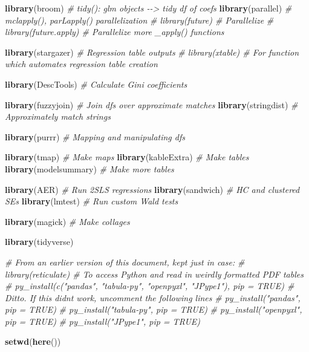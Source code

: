 \documentclass[
]{article}
\newenvironment{Shaded}{\begin{snugshade}}{\end{snugshade}}
\newcommand{\CommentTok}[1]{\textcolor[rgb]{0.56,0.35,0.01}{\textit{#1}}}
\newcommand{\FunctionTok}[1]{\textcolor[rgb]{0.13,0.29,0.53}{\textbf{#1}}}
\newcommand{\NormalTok}[1]{#1}
\begin{document}
\begin{Shaded}
\begin{Highlighting}[]
\FunctionTok{library}\NormalTok{(broom) }\CommentTok{\# tidy(): glm objects {-}{-}\textgreater{} tidy df of coefs }
\FunctionTok{library}\NormalTok{(parallel) }\CommentTok{\# mclapply(), parLapply() parallelization}
\CommentTok{\# library(future) \# Parallelize }
\CommentTok{\# library(future.apply) \# Parallelize more \_apply() functions}

\FunctionTok{library}\NormalTok{(stargazer) }\CommentTok{\# Regression table outputs}
\CommentTok{\# library(xtable) \# For function which automates regression table creation}

\FunctionTok{library}\NormalTok{(DescTools) }\CommentTok{\# Calculate Gini coefficients}

\FunctionTok{library}\NormalTok{(fuzzyjoin) }\CommentTok{\# Join df\textquotesingle{}s over approximate matches}
\FunctionTok{library}\NormalTok{(stringdist) }\CommentTok{\# Approximately match strings}

\FunctionTok{library}\NormalTok{(purrr) }\CommentTok{\# Mapping and manipulating dfs}

\FunctionTok{library}\NormalTok{(tmap) }\CommentTok{\# Make maps}
\FunctionTok{library}\NormalTok{(kableExtra) }\CommentTok{\# Make tables}
\FunctionTok{library}\NormalTok{(modelsummary) }\CommentTok{\# Make more tables}

\FunctionTok{library}\NormalTok{(AER) }\CommentTok{\# Run 2SLS regressions}
\FunctionTok{library}\NormalTok{(sandwich) }\CommentTok{\# HC and clustered SEs }
\FunctionTok{library}\NormalTok{(lmtest) }\CommentTok{\# Run custom Wald tests}

\FunctionTok{library}\NormalTok{(magick) }\CommentTok{\# Make collages}

\FunctionTok{library}\NormalTok{(tidyverse)}


\CommentTok{\# From an earlier version of this document, kept just in case:}
\CommentTok{\# library(reticulate) \# To access Python and read in weirdly formatted PDF tables}
\CommentTok{\# py\_install(c("pandas", "tabula{-}py", "openpyxl", "JPype1"), pip = TRUE) \# Ditto. If this didn\textquotesingle{}t work, uncomment the following lines}
\CommentTok{\# py\_install("pandas", pip = TRUE)}
\CommentTok{\# py\_install("tabula{-}py", pip = TRUE)}
\CommentTok{\# py\_install("openpyxl", pip = TRUE)}
\CommentTok{\# py\_install("JPype1", pip = TRUE)}


\FunctionTok{setwd}\NormalTok{(}\FunctionTok{here}\NormalTok{())}
\end{Highlighting}
\end{Shaded}
\end{document}
